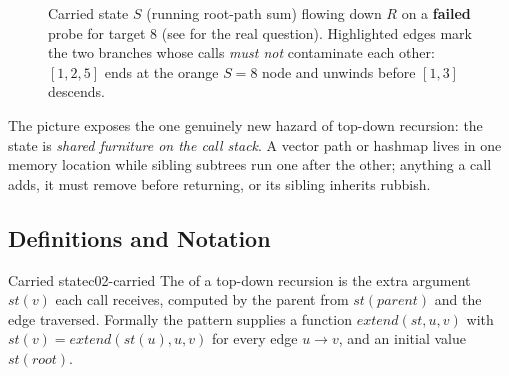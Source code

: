 \begin{figure}[H]
\centering
{}
\caption{Carried state $S$ (running root-path sum) flowing down $R$ on a
\textbf{failed} probe for target $8$ (see  for the real
question). Highlighted edges mark the two branches whose calls \emph{must not}
contaminate each other: $[1,2,5]$ ends at the orange $S{=}8$ node and unwinds
before $[1,3]$ descends.}\label{fig:c02-carry}
\end{figure}

The picture exposes the one genuinely new hazard of top-down recursion: the state
is \emph{shared furniture on the call stack}. A vector path or hashmap lives in
one memory location while sibling subtrees run one after the other; anything a
call adds, it must remove before returning, or its sibling inherits rubbish.

\subsection{Definitions and Notation}

\begin{definition}{Carried state}{c02-carried}
The  of a top-down recursion is the extra argument
$\mathit{st}(v)$ each call receives, computed by the parent from
$\mathit{st}(\mathit{parent})$ and the edge traversed. Formally the pattern
supplies a function $\mathit{extend}(\mathit{st}, u, v)$ with
$\mathit{st}(v) = \mathit{extend}(\mathit{st}(u), u, v)$ for every edge $u\to v$,
and an initial value $\mathit{st}(\mathit{root})$.
\end{definition}

